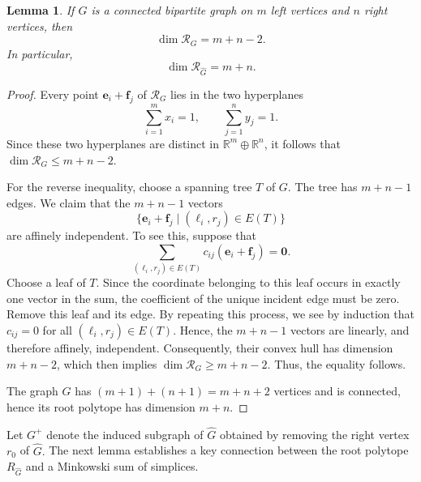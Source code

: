 \documentclass[11pt,a4paper]{article}
\newcommand{\vct}[1]{\boldsymbol{#1}}
\newcommand{\R}{\mathbb{R}}
\newcommand{\1}{\mathbf{1}}
\theoremstyle{plain}
\newtheorem{lemma}[theorem]{Lemma}
\theoremstyle{definition}
\begin{document}
\begin{lemma}\label{lem:dimension-root-polytope}
If $G$ is a connected bipartite graph on $m$ left vertices and $n$ right vertices, then
\[
\dim\mathcal R_G=m+n-2.
\]
In particular,
\[
\dim\mathcal R_{\widehat G}=m+n.
\]
\end{lemma}
\begin{proof}
Every point $\vct{e}_i+\vct{f}_j$ of $\mathcal R_G$ lies in the two hyperplanes
\[
\sum^m_{i = 1} x_i=1,
\qquad
\sum_{j=1}^n y_j=1.
\]
Since these two hyperplanes are distinct in $\R^{m}\oplus \R^n$, it follows that $\dim\mathcal R_G\le m+n-2$.

For the reverse inequality, choose a spanning tree $T$ of $G$. The tree has $m+n-1$ edges. We claim that the $m+n-1$ vectors
\[
\{\vct{e}_i+\vct{f}_j\mid (\ell_i,r_j)\in E(T)\}
\]
are affinely independent. To see this, suppose that
\[
\sum_{(\ell_i,r_j)\in E(T)}c_{ij}(\vct{e}_i+\vct{f}_j)=\vct{0}.
\]
Choose a leaf of $T$. Since the coordinate belonging to this leaf occurs in exactly one vector in the sum, the coefficient of the unique incident edge must be zero. Remove this leaf and its edge. By repeating this process, we see by induction that $c_{ij}=0$ for all $(\ell_i,r_j) \in E(T)$. Hence, the $m+n-1$ vectors are linearly, and therefore affinely, independent. Consequently, their convex hull has dimension $m+n-2$, which then implies $\dim\mathcal R_G\ge m+n-2$. Thus, the equality follows.

The graph $\widehat G$ has $(m+1)+(n+1)=m+n+2$ vertices and is connected, hence its root polytope has dimension $m+n$.
\end{proof}


Let $G^+$ denote the induced subgraph of $\widehat G$ obtained by removing the right vertex $r_0$ of $\widehat G.$ The next lemma establishes a key connection between the root polytope $R_{\widehat G}$ and a Minkowski sum of simplices.
\end{document}
